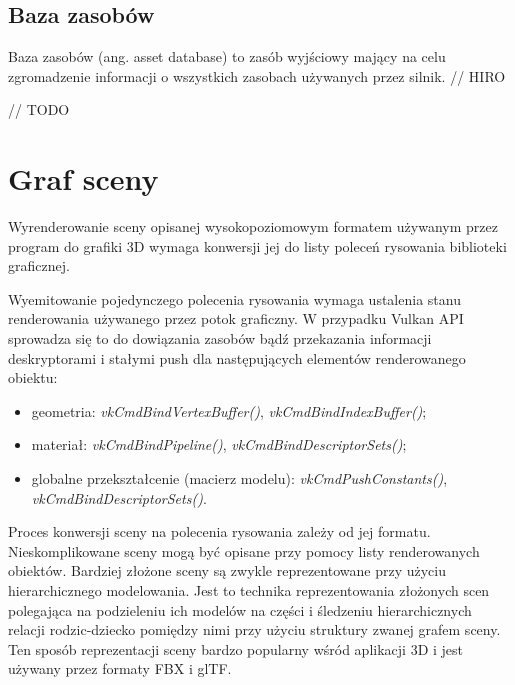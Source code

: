 \subsection{Baza zasobów}
Baza zasobów (ang. asset database) to zasób wyjściowy mający na celu zgromadzenie informacji o wszystkich zasobach używanych przez silnik.
// HIRO



// TODO

\section{Graf sceny}

Wyrenderowanie sceny opisanej wysokopoziomowym formatem używanym przez program do grafiki 3D wymaga konwersji jej do listy poleceń rysowania biblioteki graficznej.

Wyemitowanie pojedynczego polecenia rysowania wymaga ustalenia stanu renderowania używanego przez potok graficzny. W przypadku Vulkan API sprowadza się to do dowiązania zasobów bądź przekazania informacji deskryptorami i stałymi push dla następujących elementów renderowanego obiektu:
\begin{itemize}
	\item geometria: \textit{vkCmdBindVertexBuffer()}, \textit{vkCmdBindIndexBuffer()};
	\item materiał: \textit{vkCmdBindPipeline()}, \textit{vkCmdBindDescriptorSets()};
	\item globalne przekształcenie (macierz modelu): \textit{vkCmdPushConstants()}, \textit{vkCmdBindDescriptorSets()}.
\end{itemize}

Proces konwersji sceny na polecenia rysowania zależy od jej formatu.
Nieskomplikowane sceny mogą być opisane przy pomocy listy renderowanych obiektów. Bardziej złożone sceny są zwykle reprezentowane przy użyciu hierarchicznego modelowania.
Jest to technika reprezentowania złożonych scen polegająca na podzieleniu ich modelów na części i śledzeniu hierarchicznych relacji rodzic-dziecko pomiędzy nimi przy użyciu struktury zwanej grafem sceny. Ten sposób reprezentacji sceny bardzo popularny wśród aplikacji 3D i jest używany przez formaty FBX i glTF.

